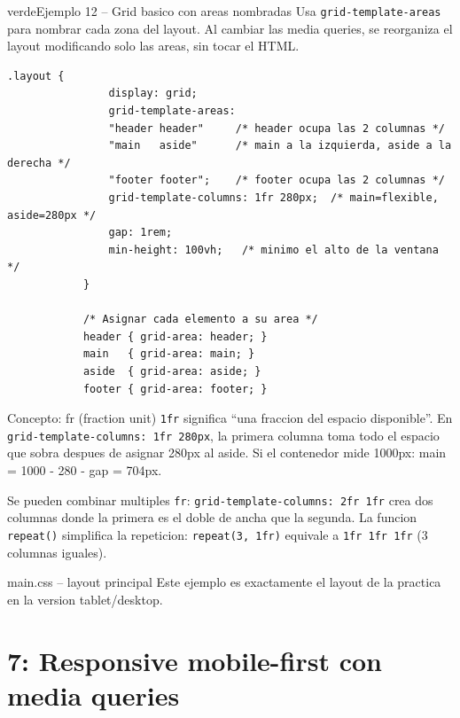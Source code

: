 \documentclass[11pt,a4paper]{article}
\begin{document}
	\begin{cajacodigo}{verde}{Ejemplo 12 -- Grid basico con areas nombradas}
		{\color{codigotexto}\small Usa \texttt{grid-template-areas} para nombrar cada zona del layout. Al cambiar las media queries, se reorganiza el layout modificando solo las areas, sin tocar el HTML.}
		\begin{lstlisting}[style=codecss]
			.layout {
				display: grid;
				grid-template-areas:
				"header header"     /* header ocupa las 2 columnas */
				"main   aside"      /* main a la izquierda, aside a la derecha */
				"footer footer";    /* footer ocupa las 2 columnas */
				grid-template-columns: 1fr 280px;  /* main=flexible, aside=280px */
				gap: 1rem;
				min-height: 100vh;   /* minimo el alto de la ventana */
			}
			
			/* Asignar cada elemento a su area */
			header { grid-area: header; }
			main   { grid-area: main; }
			aside  { grid-area: aside; }
			footer { grid-area: footer; }
		\end{lstlisting}
	\end{cajacodigo}
	
	\begin{cajaconcepto}{Concepto: fr (fraction unit)}
		\texttt{1fr} significa ``una fraccion del espacio disponible''. En \texttt{grid-template-columns: 1fr 280px}, la primera columna toma todo el espacio que sobra despues de asignar 280px al aside. Si el contenedor mide 1000px: main = 1000 - 280 - gap = 704px.
		
		Se pueden combinar multiples \texttt{fr}: \texttt{grid-template-columns: 2fr 1fr} crea dos columnas donde la primera es el doble de ancha que la segunda. La funcion \texttt{repeat()} simplifica la repeticion: \texttt{repeat(3, 1fr)} equivale a \texttt{1fr 1fr 1fr} (3 columnas iguales).
	\end{cajaconcepto}
	
	\begin{cajapractica}{main.css -- layout principal}
		Este ejemplo es exactamente el layout de la practica en la version tablet/desktop.
	\end{cajapractica}
	
	\section{7: Responsive mobile-first con media queries}
	
\end{document}
